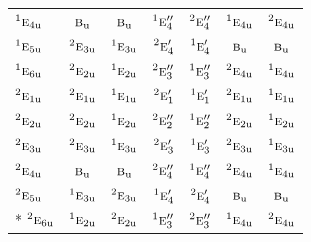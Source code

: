 \documentclass[10pt,a4paper]{article}
\numberwithin{equation}{section}
\newcommand{\irr}[1]{\text{\normalfont\scshape #1}}
\newcommand{\conjpair}[1]{{}^{#1}}
\newcommand{\ptag}[1]{\mathrm{#1}}
\begin{document}
{\begin{longtable}{@{}lcccccc@{}}
$\conjpair{1}\irr{e}_{4\ptag{u}}$ & $\irr{b}_{\ptag{u}}$ & $\irr{b}_{\ptag{u}}$ & $\conjpair{1}\irr{e}_{4}''$ & $\conjpair{2}\irr{e}_{4}''$ & $\conjpair{1}\irr{e}_{4\ptag{u}}$ & $\conjpair{2}\irr{e}_{4\ptag{u}}$\\
$\conjpair{1}\irr{e}_{5\ptag{u}}$ & $\conjpair{2}\irr{e}_{3\ptag{u}}$ & $\conjpair{1}\irr{e}_{3\ptag{u}}$ & $\conjpair{2}\irr{e}_{4}'$ & $\conjpair{1}\irr{e}_{4}'$ & $\irr{b}_{\ptag{u}}$ & $\irr{b}_{\ptag{u}}$\\
$\conjpair{1}\irr{e}_{6\ptag{u}}$ & $\conjpair{2}\irr{e}_{2\ptag{u}}$ & $\conjpair{1}\irr{e}_{2\ptag{u}}$ & $\conjpair{2}\irr{e}_{3}''$ & $\conjpair{1}\irr{e}_{3}''$ & $\conjpair{2}\irr{e}_{4\ptag{u}}$ & $\conjpair{1}\irr{e}_{4\ptag{u}}$\\
$\conjpair{2}\irr{e}_{1\ptag{u}}$ & $\conjpair{2}\irr{e}_{1\ptag{u}}$ & $\conjpair{1}\irr{e}_{1\ptag{u}}$ & $\conjpair{2}\irr{e}_{1}'$ & $\conjpair{1}\irr{e}_{1}'$ & $\conjpair{2}\irr{e}_{1\ptag{u}}$ & $\conjpair{1}\irr{e}_{1\ptag{u}}$\\
$\conjpair{2}\irr{e}_{2\ptag{u}}$ & $\conjpair{2}\irr{e}_{2\ptag{u}}$ & $\conjpair{1}\irr{e}_{2\ptag{u}}$ & $\conjpair{2}\irr{e}_{2}''$ & $\conjpair{1}\irr{e}_{2}''$ & $\conjpair{2}\irr{e}_{2\ptag{u}}$ & $\conjpair{1}\irr{e}_{2\ptag{u}}$\\
$\conjpair{2}\irr{e}_{3\ptag{u}}$ & $\conjpair{2}\irr{e}_{3\ptag{u}}$ & $\conjpair{1}\irr{e}_{3\ptag{u}}$ & $\conjpair{2}\irr{e}_{3}'$ & $\conjpair{1}\irr{e}_{3}'$ & $\conjpair{2}\irr{e}_{3\ptag{u}}$ & $\conjpair{1}\irr{e}_{3\ptag{u}}$\\
$\conjpair{2}\irr{e}_{4\ptag{u}}$ & $\irr{b}_{\ptag{u}}$ & $\irr{b}_{\ptag{u}}$ & $\conjpair{2}\irr{e}_{4}''$ & $\conjpair{1}\irr{e}_{4}''$ & $\conjpair{2}\irr{e}_{4\ptag{u}}$ & $\conjpair{1}\irr{e}_{4\ptag{u}}$\\
$\conjpair{2}\irr{e}_{5\ptag{u}}$ & $\conjpair{1}\irr{e}_{3\ptag{u}}$ & $\conjpair{2}\irr{e}_{3\ptag{u}}$ & $\conjpair{1}\irr{e}_{4}'$ & $\conjpair{2}\irr{e}_{4}'$ & $\irr{b}_{\ptag{u}}$ & $\irr{b}_{\ptag{u}}$\\*
$\conjpair{2}\irr{e}_{6\ptag{u}}$ & $\conjpair{1}\irr{e}_{2\ptag{u}}$ & $\conjpair{2}\irr{e}_{2\ptag{u}}$ & $\conjpair{1}\irr{e}_{3}''$ & $\conjpair{2}\irr{e}_{3}''$ & $\conjpair{1}\irr{e}_{4\ptag{u}}$ & $\conjpair{2}\irr{e}_{4\ptag{u}}$\\
\bottomrule\end{longtable}}
\end{document}
